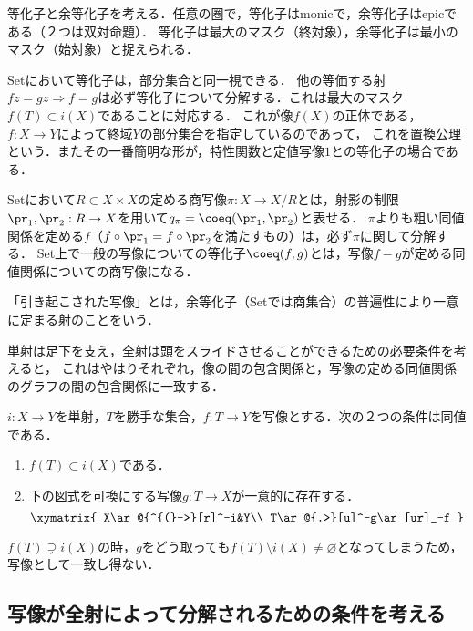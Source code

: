 \documentclass[uplatex,dvipdfmx]{jsreport}
\begin{document}
\begin{screen}
    等化子と余等化子を考える．任意の圏で，等化子はmonicで，余等化子はepicである（２つは双対命題）．
    等化子は最大のマスク（終対象），余等化子は最小のマスク（始対象）と捉えられる．

    Setにおいて等化子は，部分集合と同一視できる．
    他の等価する射$fz=gz\Rightarrow f=g$は必ず等化子について分解する．これは最大のマスク$f(T)\subset i(X)$であることに対応する．
    これが像$f(X)$の正体である，$f:X\to Y$によって終域$Y$の部分集合を指定しているのであって，
    これを置換公理という．またその一番簡明な形が，特性関数と定値写像$1$との等化子の場合である．

    Setにおいて$R\subset X\times X$の定める商写像$\pi:X\to X/R$とは，射影の制限$\pr_1,\pr_2:R\to X$を用いて$q_\pi=\coeq(\pr_1,\pr_2)$と表せる．
    $\pi$よりも粗い同値関係を定める$f$（$f\circ \pr_1=f\circ\pr_2$を満たすもの）は，必ず$\pi$に関して分解する．
    Set上で一般の写像についての等化子$\coeq(f,g)$とは，写像$f-g$が定める同値関係についての商写像になる．

    「引き起こされた写像」とは，余等化子（Setでは商集合）の普遍性により一意に定まる射のことをいう．

    単射は足下を支え，全射は頭をスライドさせることができるための必要条件を考えると，
    これはやはりそれぞれ，像の間の包含関係と，写像の定める同値関係のグラフの間の包含関係に一致する．
\end{screen}

\begin{proposition}
    $i:X\to Y$を単射，$T$を勝手な集合，$f:T\to Y$を写像とする．次の２つの条件は同値である．
    \begin{enumerate}
        \item $f(T)\subset i(X)$である．
        \item 下の図式を可換にする写像$g:T\to X$が一意的に存在する．
        \[\xymatrix{
            X\ar@{^{(}->}[r]^-i&Y\\
            T\ar@{.>}[u]^-g\ar[ur]_-f
        }\]
    \end{enumerate}
\end{proposition}
$f(T)\supsetneq i(X)$の時，$g$をどう取っても$f(T)\setminus i(X)\ne\varnothing$となってしまうため，写像として一致し得ない．

\subsection{写像が全射によって分解されるための条件を考える}
\end{document}
